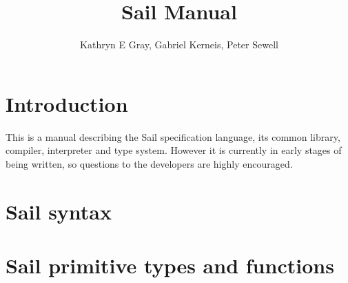 \documentclass[11pt]{article}
\begin{document}


\title{Sail Manual}
\author{Kathryn E Gray, Gabriel Kerneis, Peter Sewell}

\maketitle

\tableofcontents

\newpage

\section{Introduction}

This is a manual describing the Sail specification language, its
common library, compiler, interpreter and type system. However it is
currently in early stages of being written, so questions to the
developers are highly encouraged.

\section{Sail syntax}

\ottgrammartabular{
\ottl\ottinterrule
\ottannot\ottinterrule
\ottid\ottinterrule
\ottkid\ottinterrule
\ottbaseXXkind\ottinterrule
\ottkind\ottinterrule
\ottnexp\ottinterrule
\ottorder\ottinterrule
\ottbaseXXeffect\ottinterrule
\otteffect\ottinterrule
\otttyp\ottinterrule
\otttypXXarg\ottinterrule
\ottnXXconstraint\ottinterrule
\ottkindedXXid\ottinterrule
\ottquantXXitem\ottinterrule
\otttypquant\ottinterrule
\otttypschm\ottinterrule
\ottnameXXscmXXopt\ottinterrule
\otttypeXXdef\ottinterrule
\otttypeXXunion\ottinterrule
\ottindexXXrange\ottinterrule
\ottlit\ottinterrule
\ottsemiXXopt\ottinterrule
\ottpat\ottinterrule
\ottfpat\ottinterrule
\ottexp\ottinterrule
\ottlexp\ottinterrule
\ottfexp\ottinterrule
\ottfexps\ottinterrule
\ottoptXXdefault\ottinterrule
\ottpexp\ottinterrule
\otttannotXXopt\ottinterrule
\ottrecXXopt\ottinterrule
\otteffectXXopt\ottinterrule
\ottfuncl\ottinterrule
\ottfundef\ottinterrule
\ottletbind\ottinterrule
\ottvalXXspec\ottinterrule
\ottdefaultXXspec\ottinterrule
\ottscatteredXXdef\ottinterrule
\ottregXXid\ottinterrule
\ottaliasXXspec\ottinterrule
\ottdecXXspec\ottinterrule
\ottdef\ottinterrule
\ottdefs\ottinterrule}

\newpage
\section{Sail primitive types and functions}
\end{document}
